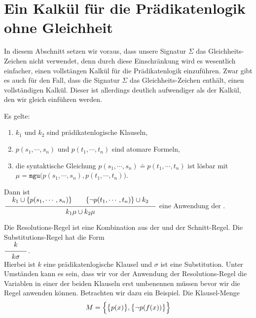 \section{Ein Kalkül für die Prädikatenlogik ohne Gleichheit}
In diesem Abschnitt setzen wir voraus, dass unsere Signatur $\Sigma$ das Gleichheits-Zeichen nicht
verwendet, denn durch diese Einschränkung wird es wesentlich einfacher, einen vollstängen Kalkül für
die Prädikatenlogik einzuführen.  Zwar gibt es auch für den Fall, dass die Signatur $\Sigma$ das
Gleichheits-Zeichen enthält, einen vollständigen Kalkül.  Dieser ist allerdings deutlich
aufwendiger als der Kalkül, den wir gleich einführen werden.

\begin{Definition}  
    Es gelte:
    \begin{enumerate}
    \item $k_1$ und $k_2$ sind prädikatenlogische Klauseln,
    \item $p(s_1,\cdots,s_n)$ und $p(t_1,\cdots,t_n)$ sind atomare Formeln,
    \item die syntaktische Gleichung $p(s_1,\cdots,s_n)  \doteq p(t_1,\cdots,t_n)$ ist lösbar mit 
          \\[0.2cm]
          \hspace*{1.3cm}
          $\mu = \mathtt{mgu}\bigl(p(s_1,\cdots,s_n), p(t_1,\cdots,t_n)\bigr)$. 
    \end{enumerate}
     Dann ist 
     \\[0.2cm]
     \hspace*{1.3cm}
     $\schluss{k_1 \cup\{ p(s_1,\cdots,s_n)\} \quad\quad \{\neg p(t_1,\cdots,t_n)\} \cup k_2}{
                 k_1\mu \cup k_2\mu} 
     $
     eine Anwendung der .
     \eox
\end{Definition}
Die Resolutions-Regel ist eine Kombination aus der  und der 
Schnitt-Regel.  Die Substitutions-Regel  hat die Form
\\[0.2cm]
\hspace*{1.3cm}
$\schluss{k}{k\sigma}$. 
\\[0.2cm]
Hierbei ist $k$ eine prädikatenlogische Klausel und $\sigma$ ist eine Substitution.
Unter Umständen kann es sein, dass wir vor der Anwendung der Resolutions-Regel 
die Variablen in einer der beiden Klauseln erst umbenennen
müssen bevor wir die Regel anwenden können.  Betrachten wir dazu ein Beispiel.
Die Klausel-Menge 
\[ M = \Bigl\{ \bigl\{ p(x) \bigr\}, \bigl\{ \neg p(f(x)) \bigr\} \Bigr\} \]
